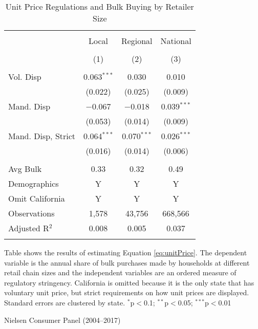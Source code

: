 
\begin{table}[!htbp] \centering
  \caption{Unit Price Regulations and Bulk Buying by Retailer Size}
  \label{tab:unitPriceLawChain}
\begin{tabular}{@{\extracolsep{5pt}}lccc}
\\[-1.8ex]\hline
\hline \\[-1.8ex]
 & Local & Regional & National \\
\\[-1.8ex] & (1) & (2) & (3)\\
\hline \\[-1.8ex]
 Vol. Disp & 0.063$^{***}$ & 0.030 & 0.010 \\
  & (0.022) & (0.025) & (0.009) \\
  Mand. Disp & $-$0.067 & $-$0.018 & 0.039$^{***}$ \\
  & (0.053) & (0.014) & (0.009) \\
  Mand. Disp, Strict & 0.064$^{***}$ & 0.070$^{***}$ & 0.026$^{***}$ \\
  & (0.016) & (0.014) & (0.006) \\
 \hline \\[-1.8ex]
Avg Bulk & 0.33 & 0.32 & 0.49 \\
Demographics & Y & Y & Y \\
Omit California & Y & Y & Y \\
Observations & 1,578 & 43,756 & 668,566 \\
Adjusted R$^{2}$ & 0.008 & 0.005 & 0.037 \\
\hline
\hline \\[-1.8ex]
\end{tabular}
\begin{tablenotes}
Table shows the results of estimating Equation \ref{eq:unitPrice}. The dependent variable is the annual share of bulk purchases made by households at different retail chain sizes and the independent variables are an ordered measure of regulatory stringency. California is omitted because it is the only state that has voluntary unit price, but strict requirements on how unit prices are displayed. Standard errors are clustered by state. $^{*}$p$<$0.1; $^{**}$p$<$0.05; $^{***}$p$<$0.01
\end{tablenotes}
\begin{tablenotes}[Source]
Nielsen Consumer Panel (2004--2017)
\end{tablenotes}
\end{table}
